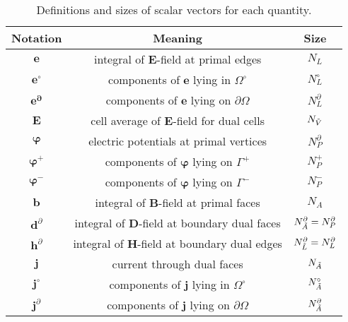 \documentclass{article}
\begin{document}
\begin{table}[]
    \centering
\begin{tabular}{c c c}
     \hline
     \textbf{Notation}  & \textbf{Meaning}  & \textbf{Size} \\
     \hline
     $\mathbf{e}$ & integral of $\mathbf{E}$-field at primal edges& $N_L$ \\
     $\mathbf{e^\circ}$ & components of $\mathbf{e}$ lying in $\Omega^\circ$ & $N_L^\circ$ \\
     $\mathbf{e^\partial}$ & components of $\mathbf{e}$ lying on $\partial \Omega$ & $N_L^\partial$ \\
     $\mathbf{E}$ & cell average of $\mathbf{E}$-field for dual cells & $N_{\Tilde{V}}$ \\ 
     $\bm{\varphi}$ & electric potentials at primal vertices & $N_P^\partial$ \\
     $\bm{\varphi}^+$ & components of $\bm{\varphi}$ lying on $\Gamma^+$ & $N_P^+$ \\
     $\bm{\varphi}^-$ & components of $\bm{\varphi}$ lying on $\Gamma^-$ & $N_P^-$ \\
     $\mathbf{b}$ & integral of $\mathbf{B}$-field at primal faces & $N_A$ \\
     $\mathbf{d}^\partial$ & integral of $\mathbf{D}$-field at boundary dual faces & $N_{\Tilde{A}}^\partial = N_P^\partial$ \\
     $\mathbf{h}^\partial$ & integral of $\mathbf{H}$-field at boundary dual edges & $N_{\Tilde{L}}^\partial = N_L^\partial$ \\
     $\mathbf{j}$ & current through dual faces & $N_{\Tilde{A}}$ \\
     $\mathbf{j}^\circ$ & components of $\mathbf{j}$ lying in $\Omega^\circ$ & $N_{\Tilde{A}}^\circ$ \\
     $\mathbf{j}^\partial$ & components of $\mathbf{j}$ lying on $\partial \Omega$ & $N_{\Tilde{A}}^\partial$ \\
     \hline
\end{tabular}
    \caption{Definitions and sizes of scalar vectors for each quantity.}
    \label{tab:def_size_var}
\end{table}
\end{document}
